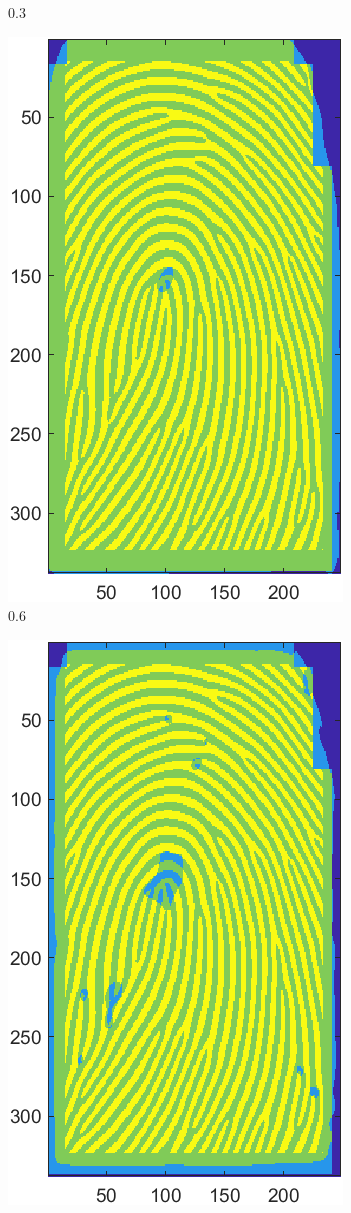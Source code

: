 \documentclass[a4paper]{article}
\begin{document}
\begin{figure}[H]
\begin{subfigure}[t]{0.2\textwidth}
         \caption{\(0.3\)}
     \end{subfigure}
     \begin{subfigure}[t]{0.2\textwidth}
      \centering
      \includegraphics[scale=0.5]{Figures/E4-e1-0.6}
      \caption{\(0.6\)}
  \end{subfigure}%
  \quad
  \begin{subfigure}[t]{0.2\textwidth}
      \centering
      \includegraphics[scale=0.5]{Figures/E4-e1-0.9}

\end{subfigure}
\end{figure}
\end{document}
